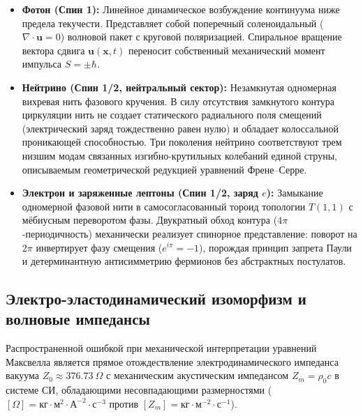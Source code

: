 \documentclass[11pt,a4paper]{article}
\theoremstyle{definition}
\theoremstyle{remark}
\begin{document}
\begin{itemize}
    \item \textbf{Фотон (Спин 1):} Линейное динамическое возбуждение континуума ниже предела текучести. Представляет собой поперечный соленоидальный ($\nabla \cdot \mathbf{u} = 0$) волновой пакет с круговой поляризацией. Спиральное вращение вектора сдвига $\mathbf{u}(\mathbf{x}, t)$ переносит собственный механический момент импульса $S = \pm \hbar$.
    
    \item \textbf{Нейтрино (Спин 1/2, нейтральный сектор):} Незамкнутая одномерная вихревая нить фазового кручения. В силу отсутствия замкнутого контура циркуляции нить не создает статического радиального поля смещений (электрический заряд тождественно равен нулю) и обладает колоссальной проникающей способностью. Три поколения нейтрино соответствуют трем низшим модам связанных изгибно-крутильных колебаний единой струны, описываемым геометрической редукцией уравнений Френе--Серре.
    
    \item \textbf{Электрон и заряженные лептоны (Спин 1/2, заряд $e$):} Замыкание одномерной фазовой нити в самосогласованный тороид топологии $T(1,1)$ с мёбиусным переворотом фазы. Двукратный обход контура ($4\pi$-периодичность) механически реализует спинорное представление: поворот на $2\pi$ инвертирует фазу смещения ($e^{i\pi} = -1$), порождая принцип запрета Паули и детерминантную антисимметрию фермионов без абстрактных постулатов.
\end{itemize}

\subsection{Электро-эластодинамический изоморфизм и волновые импедансы}
Распространенной ошибкой при механической интерпретации уравнений Максвелла 
является прямое отождествление электродинамического импеданса вакуума 
$Z_0 \approx 376.73\ \Omega$ с механическим акустическим импедансом 
$Z_m = \rho_0 c$ в системе СИ, обладающими несовпадающими размерностями 
($[\Omega] = \text{кг}\cdot\text{м}^2\cdot\text{А}^{-2}\cdot\text{с}^{-3}$ против 
$[Z_m] = \text{кг}\cdot\text{м}^{-2}\cdot\text{с}^{-1}$).
\end{document}
